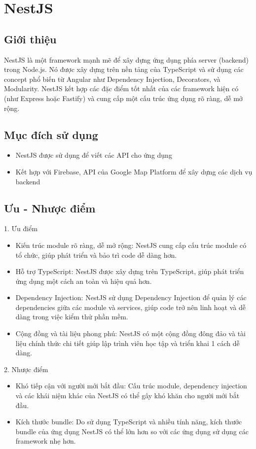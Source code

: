\documentclass[../DoAn.tex]{subfiles}
\begin{document}
\section{NestJS}
\label{section:3.2}
\subsection{Giới thiệu}
\label{subsection:3.2.1}
NestJS là một framework mạnh mẽ để xây dựng ứng dụng phía server (backend) trong Node.js. Nó được xây dựng trên nền tảng của TypeScript và sử dụng các concept phổ biến từ Angular như Dependency Injection, Decorators, và Modularity. NestJS kết hợp các đặc điểm tốt nhất của các framework hiện có (như Express hoặc Fastify) và cung cấp một cấu trúc ứng dụng rõ ràng, dễ mở rộng.

\subsection{Mục đích sử dụng}
\label{subsection:3.2.2}
\begin{itemize}
  \item NestJS được sử dụng để viết các API cho ứng dụng
  \item Kết hợp với Firebase, API của Google Map Platform để xây dựng các dịch vụ backend
\end{itemize}

\subsection{Ưu -  Nhược điểm}
\label{subsection:3.2.3}
1. Ưu điểm
\begin{itemize}
  \item Kiến trúc module rõ ràng, dễ mở rộng: NestJS cung cấp cấu trúc module có tổ chức, giúp phát triển và bảo trì code dễ dàng hơn.
  \item Hỗ trợ TypeScript: NestJS được xây dựng trên TypeScript, giúp phát triển ứng dụng một cách an toàn và hiệu quả hơn.
  \item Dependency Injection: NestJS sử dụng Dependency Injection để quản lý các dependencies giữa các module và services, giúp code trở nên linh hoạt và dễ dàng trong việc kiểm thử phần mềm.
  \item Cộng đồng và tài liệu phong phú: NestJS có một cộng đồng đông đảo và tài liệu chính thức chi tiết giúp lập trình viên học tập và triển khai 1 cách dễ dàng.
\end{itemize}

2. Nhược điểm
\begin{itemize}
  \item Khó tiếp cận với người mới bắt đầu: Cấu trúc module, dependency injection và các khái niệm khác của NestJS có thể gây khó khăn cho người mới bắt đầu.
  \item Kích thước bundle: Do sử dụng TypeScript và nhiều tính năng, kích thước bundle của ứng dụng NestJS có thể lớn hơn so với các ứng dụng sử dụng các framework nhẹ hơn.
\end{itemize}
\end{document}

